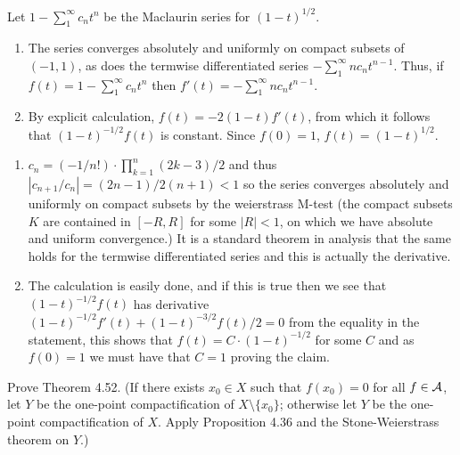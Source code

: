 \documentclass[12pt,a4paper]{article}
\begin{document}
\begin{problem}\label{prob:4-66}
Let $1 - \sum_{1}^\infty c_n t^n$ be the Maclaurin series for $(1-t)^{1/2}$.
\begin{enumerate}[label=\alph*.]
    \item The series converges absolutely and uniformly on compact subsets of $(-1,1)$, as does the termwise differentiated series $-\sum_{1}^\infty n c_n t^{n-1}$. Thus, if $f(t) = 1 - \sum_{1}^\infty c_n t^n$ then $f'(t) = -\sum_{1}^\infty n c_n t^{n-1}$.
    \item By explicit calculation, $f(t) = -2(1-t)f'(t)$, from which it follows that $(1-t)^{-1/2}f(t)$ is constant. Since $f(0) = 1$, $f(t) = (1-t)^{1/2}$.
\end{enumerate}
\end{problem}
\begin{solution}
\begin{enumerate}[label=\alph*.]
    \item $c_n=(-1/n!)\cdot\prod_{k=1}^n(2k-3)/2$ and thus $|c_{n+1}/c_n|=(2n-1)/2(n+1)<1$ so the series converges absolutely and uniformly on compact subsets by the weierstrass M-test (the compact subsets $K$ are contained in $[-R,R]$ for some $|R|<1$, on which we have absolute and uniform convergence.) 
        It is a standard theorem in analysis that the same holds for the termwise differentiated series and this is actually the derivative. 
    \item The calculation is easily done, and if this is true then we see that $(1-t)^{-1/2}f(t)$ has derivative $(1-t)^{-1/2}f'(t)+(1-t)^{-3/2}f(t)/2=0$ from the equality in the statement, this shows that $f(t)=C\cdot(1-t)^{-1/2}$ for some $C$ and as $f(0)=1$ we must have that $C=1$ proving the claim. 
\end{enumerate}
\end{solution}
\begin{problem}\label{prob:4-67}
Prove Theorem 4.52. (If there exists $x_0 \in X$ such that $f(x_0) = 0$ for all $f \in \mathcal{A}$, let $Y$ be the one-point compactification of $X \setminus \{x_0\}$; otherwise let $Y$ be the one-point compactification of $X$. Apply Proposition 4.36 and the Stone-Weierstrass theorem on $Y$.)
\end{problem}
\end{document}
